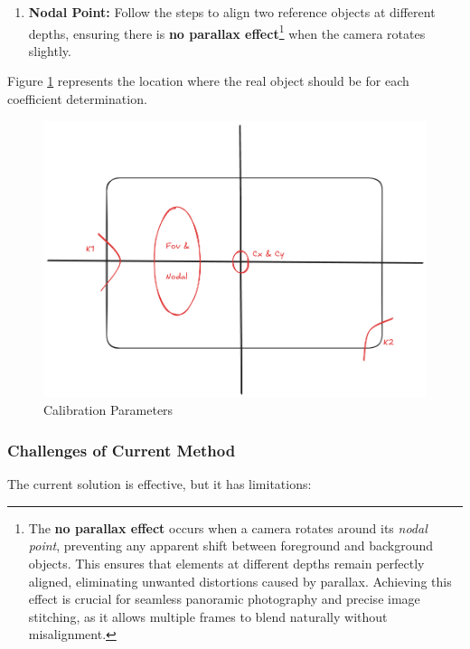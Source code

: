 \begin{enumerate}
    \item \textbf{Nodal Point:} Follow the steps to align two reference objects at different depths, ensuring there is \textbf{no parallax effect}\footnote{The \textbf{no parallax effect} occurs when a camera rotates around its \textit{nodal point}, preventing any apparent shift between foreground and background objects. This ensures that elements at different depths remain perfectly aligned, eliminating unwanted distortions caused by parallax. Achieving this effect is crucial for seamless panoramic photography and precise image stitching, as it allows multiple frames to blend naturally without misalignment.} when the camera rotates slightly.
\end{enumerate}


\noindent Figure \ref{fig:CP} represents the location where the real object should be for each coefficient determination.

\begin{figure}
    \centering
    \includegraphics[width=\textwidth]{Images/02stateart/Calibration Parameters.png}
    \caption{Calibration Parameters}
    \label{fig:CP}
\end{figure}

\subsubsection*{Challenges of Current Method}

\noindent The current solution is effective, but it has limitations:

